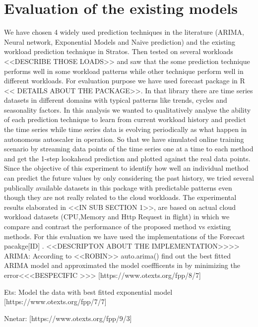 
\section{Evaluation of the existing models}

We have chosen 4 widely used prediction techniques in the literature (ARIMA, Neural network, Exponential Models and Naive prediction) and the existing workload prediction technique in Stratos. Then tested on several workloads <<DESCRIBE THOSE LOADS>> and saw that the some prediction technique performs well in some workload patterns while other technique perform well in different workloads.
For evaluation purpose we have used forecast package in R << DETAILS ABOUT THE PACKAGE>>. In that library there are time series datasets in different domains with typical patterns like trends, cycles and seasonality factors. In this analysis we wanted to qualitatively analyse the ability of each prediction technique to learn from current workload history and predict the time series while time series data is evolving periodically as what happen in autonomous autoscaler in operation. So that we have simulated online training scenario by streaming data points of the time series one at a time to each method and get the 1-step lookahead prediction and plotted against the real data points. Since the objective of this experiment to identify  how well an individual method can predict the future values by only considering the past history, we tried several publically available datasets in this package with predictable patterns even though they are not really related to the cloud workloads. The experimental results elaborated in <<IN SUB SECTION 1>>, are based on actual cloud workload datasets (CPU,Memory and Http Request in flight)  in which we  compare and contrast the performance of the proposed method vs existing methods. 
For this evaluation we have used the implementations of the Forecast pacakge[ID] . <<DESCRIPTON ABOUT THE IMPLEMENTATION>>>>
ARIMA: According to <<ROBIN>> auto.arima()  find out the best fitted ARIMA model and approximated the model coeffficents in by minimizing the error<<<BESPECIFIC >>> [https://www.otexts.org/fpp/8/7]

Ets: Model the data with best fitted exponential model [https://www.otexts.org/fpp/7/7]

	Nnetar: [https://www.otexts.org/fpp/9/3]

